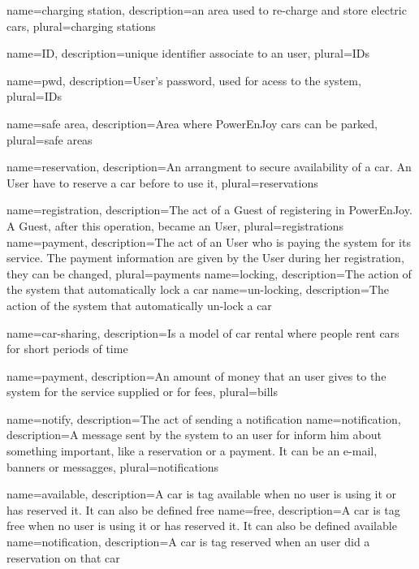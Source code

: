 {
  name={charging station},
  description={an area used to re-charge and store electric cars},
  plural={charging stations}
}

{
  name={ID},
  description={unique identifier associate to an user},
  plural={IDs}
}

{
  name={pwd},
  description={User's password, used for acess to the system},
  plural={IDs}
}

{
  name={safe area},
  description={Area where PowerEnJoy cars can be parked},
  plural={safe areas}
}

{
  name={reservation},
  description={An arrangment to secure availability of a car. An User have to reserve a car before to use it},
  plural={reservations}
}


{
	name={registration},
	description={The act of a Guest of registering in PowerEnJoy. A Guest, after this operation, became an User},
	plural={registrations}
}
{
	name={payment},
	description={The act of an User who is paying the system for its service. The payment information are given by the User during her \gls{registration}, they can be changed},
	plural={payments}
}
{
	name={locking},
	description={The action of the system that automatically lock a car}
}
{
	name={un-locking},
	description={The action of the system that automatically un-lock a car}
}

{
	name={car-sharing},
	description={Is a model of car rental where people rent cars for short periods of time}
}

{
	name={payment},
	description={An amount of money that an user gives to the system for the service supplied or for fees},
	plural={bills}
}

{
	name={notify},
	description={The act of sending a notification}
}
{
	name={notification},
	description={A message sent by the system to an user for inform him about something important, like a reservation or a payment. It can be an e-mail, banners or messagges},
	plural={notifications}
}

{
	name={available},
	description={A car is tag available when no user is using it or has reserved it. It can also be defined free}
}
{
	name={free},
	description={A car is tag free when no user is using it or has reserved it. It can also be defined available}
}
{
	name={notification},
	description={A car is tag reserved when an user did a reservation on that car}
}

